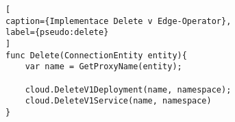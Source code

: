 \begin{lstfloat}
\begin{lstlisting}[
caption={Implementace Delete v Edge-Operator},
label={pseudo:delete}
]
func Delete(ConnectionEntity entity){
    var name = GetProxyName(entity);

    cloud.DeleteV1Deployment(name, namespace);
    cloud.DeleteV1Service(name, namespace)
}
\end{lstlisting}
\end{lstfloat}